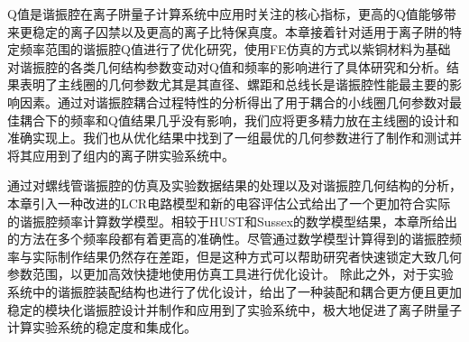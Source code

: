 Q值是谐振腔在离子阱量子计算系统中应用时关注的核心指标，更高的Q值能够带来更稳定的离子囚禁以及更高的离子比特保真度。本章接着针对适用于离子阱的特定频率范围的谐振腔Q值进行了优化研究，使用FE仿真的方式以紫铜材料为基础对谐振腔的各类几何结构参数变动对Q值和频率的影响进行了具体研究和分析。结果表明了主线圈的几何参数尤其是其直径、螺距和总线长是谐振腔性能最主要的影响因素。通过对谐振腔耦合过程特性的分析得出了用于耦合的小线圈几何参数对最佳耦合下的频率和Q值结果几乎没有影响，我们应将更多精力放在主线圈的设计和准确实现上。我们也从优化结果中找到了一组最优的几何参数进行了制作和测试并将其应用到了组内的离子阱实验系统中。

通过对螺线管谐振腔的仿真及实验数据结果的处理以及对谐振腔几何结构的分析，本章引入一种改进的LCR电路模型和新的电容评估公式给出了一个更加符合实际的谐振腔频率计算数学模型。相较于HUST和Sussex的数学模型结果，本章所给出的方法在多个频率段都有着更高的准确性。尽管通过数学模型计算得到的谐振腔频率与实际制作结果仍然存在差距，但是这种方式可以帮助研究者快速锁定大致几何参数范围，以更加高效快捷地使用仿真工具进行优化设计。
除此之外，对于实验系统中的谐振腔装配结构也进行了优化设计，给出了一种装配和耦合更方便且更加稳定的模块化谐振腔设计并制作和应用到了实验系统中，极大地促进了离子阱量子计算实验系统的稳定度和集成化。